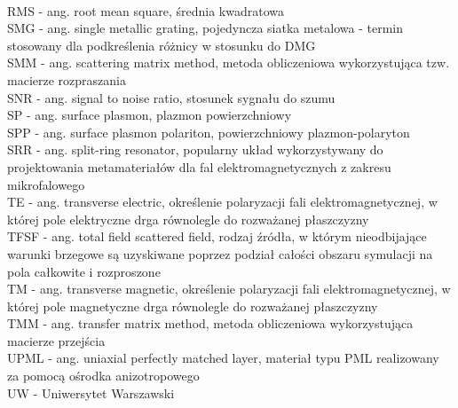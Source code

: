 \\RMS - ang. root mean square, średnia kwadratowa
\\SMG - ang. single metallic grating, pojedyncza siatka metalowa - termin stosowany dla podkreślenia różnicy w stosunku do DMG
\\SMM - ang. scattering matrix method, metoda obliczeniowa wykorzystująca tzw. macierze rozpraszania
\\SNR - ang. signal to noise ratio, stosunek sygnału do szumu
\\SP - ang. surface plasmon, plazmon powierzchniowy
\\SPP - ang. surface plasmon polariton, powierzchniowy plazmon-polaryton
\\SRR - ang. split-ring resonator, popularny układ wykorzystywany do projektowania metamateriałów dla fal elektromagnetycznych z zakresu mikrofalowego
\\TE - ang. transverse electric, określenie polaryzacji fali elektromagnetycznej, w której pole elektryczne drga równolegle do rozważanej płaszczyzny
\\TFSF - ang. total field scattered field, rodzaj źródła, w którym nieodbijające warunki brzegowe są uzyskiwane poprzez podział całości obszaru symulacji na pola całkowite i rozproszone
\\TM - ang. transverse magnetic, określenie polaryzacji fali elektromagnetycznej, w której pole magnetyczne drga równolegle do rozważanej płaszczyzny
\\TMM - ang. transfer matrix method, metoda obliczeniowa wykorzystująca macierze przejścia
\\UPML - ang.  uniaxial perfectly matched layer, materiał typu PML realizowany za pomocą ośrodka anizotropowego
\\UW - Uniwersytet Warszawski
